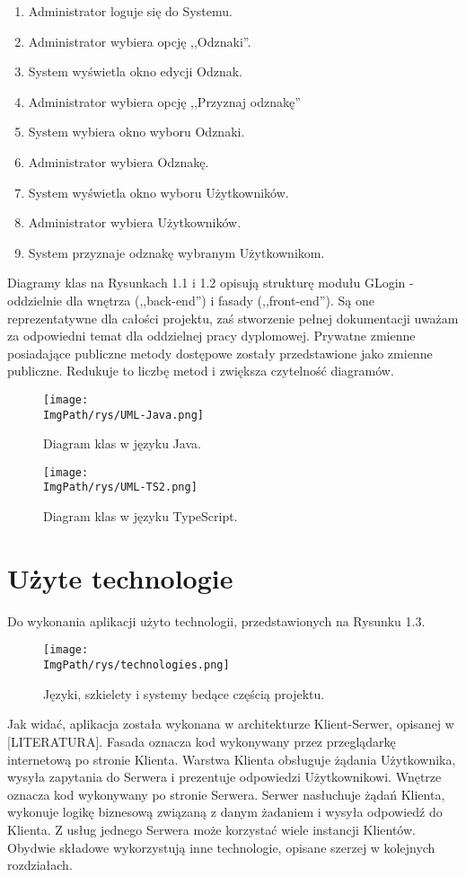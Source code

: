 \documentclass[a4paper,12pt,twoside,openany]{report}
\newcommand{\ImgPath}{.}
\begin{document}
	\begin{enumerate}
		\item Administrator loguje się do Systemu.
		\item Administrator wybiera opcję ,,Odznaki''.
		\item System wyświetla okno edycji Odznak.
		\item Administrator wybiera opcję ,,Przyznaj odznakę''
		\item System wybiera okno wyboru Odznaki.
		\item Administrator wybiera Odznakę.
		\item System wyświetla okno wyboru Użytkowników.
		\item Administrator wybiera Użytkowników.
		\item System przyznaje odznakę wybranym Użytkownikom.
	\end{enumerate}
	Diagramy klas na Rysunkach 1.1 i 1.2 opisują strukturę modułu GLogin - oddzielnie dla wnętrza (,,back-end'') i fasady (,,front-end''). Są one reprezentatywne dla całości projektu, zaś stworzenie pełnej dokumentacji uważam za odpowiedni temat dla oddzielnej pracy dyplomowej. Prywatne zmienne posiadające publiczne metody dostępowe zostały przedstawione jako zmienne publiczne. Redukuje to liczbę metod i zwiększa czytelność diagramów.
	\begin{sidewaysfigure}[!htbp]

			\texttt{[image: \\ImgPath/rys/UML-Java.png]}

		\caption{Diagram klas w języku Java.}
		\label{UMLJava}
	\end{sidewaysfigure}
		\begin{sidewaysfigure}[!htbp]

				\texttt{[image: \\ImgPath/rys/UML-TS2.png]}

			\caption{Diagram klas w języku TypeScript.}
			\label{UMLTS}
		\end{sidewaysfigure}
\section{Użyte technologie}
Do wykonania aplikacji użyto technologii, przedstawionych na Rysunku 1.3.
	\begin{figure}[!htbp]
		\begin{center}
			\centering
			\texttt{[image: \\ImgPath/rys/technologies.png]}
		\end{center}
		\caption{Języki, szkielety i systemy bedące częścią projektu.}
		\label{technologies}
	\end{figure}
Jak widać, aplikacja została wykonana w architekturze Klient-Serwer, opisanej w [LITERATURA]. Fasada oznacza kod wykonywany przez przeglądarkę internetową po stronie Klienta. Warstwa Klienta obsługuje żądania Użytkownika, wysyła zapytania do Serwera i prezentuje odpowiedzi Użytkownikowi. Wnętrze oznacza kod wykonywany po stronie Serwera. Serwer nasłuchuje żądań Klienta, wykonuje logikę biznesową związaną z danym żadaniem i wysyła odpowiedź do Klienta. Z usług jednego Serwera może korzystać wiele instancji Klientów. Obydwie składowe wykorzystują inne technologie, opisane szerzej w kolejnych rozdziałach.
\end{document}
